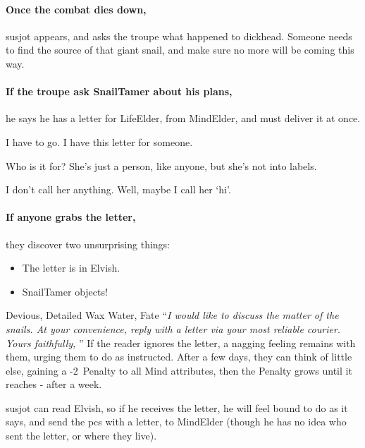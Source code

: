\paragraph{Once the combat dies down,}
\gls{susjot} appears, and asks the troupe what happened to \gls{dickhead}.
Someone needs to find the source of that giant snail, and make sure no more will be coming this way.

\paragraph{If the troupe ask \gls{SnailTamer} about his plans,}
he says he has a letter for \gls{LifeElder}, from \gls{MindElder}, and must deliver it at once.

\begin{speechtext}
  I have to go.
  I have this letter for someone.

  Who is it for?
  She's just a person, like anyone, but she's not into labels.

  I don't call her anything.
  Well, maybe I call her `hi'.
\end{speechtext}

\paragraph{If anyone grabs the letter,}
they discover two unsurprising things:

\begin{itemize}
  \item
  The letter is in Elvish.
  \item
  \Gls{SnailTamer} objects!
\end{itemize}

  {Devious, Detailed}%
  {Wax}%
  {Water, Fate}%
  {}%
  {``\textit{I would like to discuss the matter of the snails.
  At your convenience, reply with a letter via your most reliable courier.  Yours faithfully, }''}%
  {If the reader ignores the letter, a nagging feeling remains with them, urging them to do as instructed.
  After a few days, they can think of little else, gaining a -2~Penalty to all Mind \glspl{attribute}, then the Penalty grows until it  reaches - after a week.}%

\label{urgentLetter}
\showTalisman

\Gls{susjot} can read Elvish, so if he receives the letter, he will feel bound to do as it says, and send the \glspl{pc} with a letter, to \gls{MindElder} (though he has no idea who sent the letter, or where they live).

